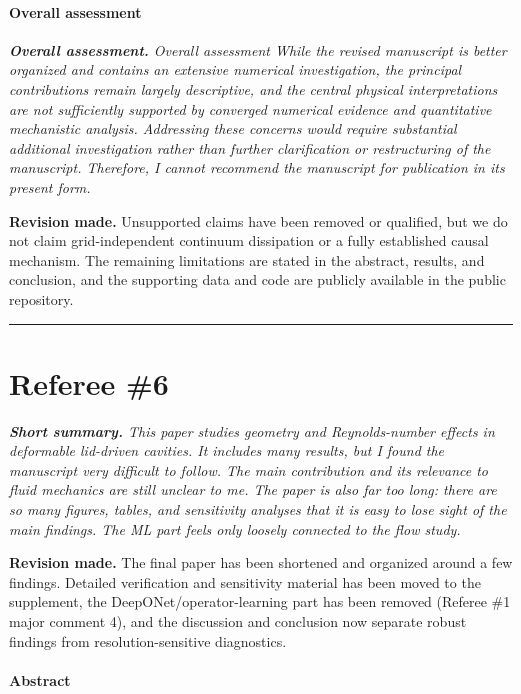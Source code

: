 \documentclass[11pt,a4paper]{article}
\newcommand{\qcomment}[1]{\textcolor{deepblue}{\itshape #1}}
\newcommand{\revwork}[1]{\textbf{\textcolor{revgreen}{#1}}}
\newcommand{\ruleline}{\begin{center}\rule{0.6\textwidth}{0.6pt}\end{center}}
\begin{document}
\medskip
\paragraph{Overall assessment}

\medskip
\noindent\qcomment{\textbf{Overall assessment.} Overall assessment While the revised manuscript is better organized and contains an extensive numerical investigation, the principal contributions remain largely descriptive, and the central physical interpretations are not sufficiently supported by converged numerical evidence and quantitative mechanistic analysis. Addressing these concerns would require substantial additional investigation rather than further clarification or restructuring of the manuscript. Therefore, I cannot recommend the manuscript for publication in its present form.}

\noindent\revwork{Revision made.} Unsupported claims have been removed or qualified, but we do not claim grid-independent continuum dissipation or a fully established causal mechanism. The remaining limitations are stated in the abstract, results, and conclusion, and the supporting data and code are publicly available in the public repository.

\bigskip
\ruleline

\section*{Referee \#6}

\medskip
\noindent\qcomment{\textbf{Short summary.} This paper studies geometry and Reynolds-number effects in deformable lid-driven cavities. It includes many results, but I found the manuscript very difficult to follow. The main contribution and its relevance to fluid mechanics are still unclear to me. The paper is also far too long: there are so many figures, tables, and sensitivity analyses that it is easy to lose sight of the main findings. The ML part feels only loosely connected to the flow study.}

\noindent\revwork{Revision made.} The final paper has been shortened and organized around a few findings. Detailed verification and sensitivity material has been moved to the supplement, the DeepONet/operator-learning part has been removed (Referee \#1 major comment 4), and the discussion and conclusion now separate robust findings from resolution-sensitive diagnostics.

\medskip
\paragraph{Abstract}
\end{document}
